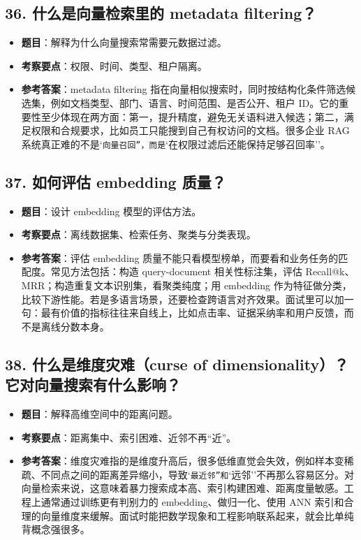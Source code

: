 \subsection{36. 什么是向量检索里的 metadata filtering？}
\begin{itemize}[leftmargin=2em]
\item \textbf{题目}：解释为什么向量搜索常需要元数据过滤。
\item \textbf{考察要点}：权限、时间、类型、租户隔离。
\item \textbf{参考答案}：metadata filtering 指在向量相似搜索时，同时按结构化条件筛选候选集，例如文档类型、部门、语言、时间范围、是否公开、租户 ID。它的重要性至少体现在两方面：第一，提升精度，避免无关语料进入候选；第二，满足权限和合规要求，比如员工只能搜到自己有权访问的文档。很多企业 RAG 系统真正难的不是`\texttt{向量召回''，而是}`在权限过滤后还能保持足够召回率''。
\end{itemize}

\subsection{37. 如何评估 embedding 质量？}
\begin{itemize}[leftmargin=2em]
\item \textbf{题目}：设计 embedding 模型的评估方法。
\item \textbf{考察要点}：离线数据集、检索任务、聚类与分类表现。
\item \textbf{参考答案}：评估 embedding 质量不能只看模型榜单，而要看和业务任务的匹配度。常见方法包括：构造 query-document 相关性标注集，评估 Recall@k、MRR；构造重复文本识别集，看聚类纯度；用 embedding 作为特征做分类，比较下游性能。若是多语言场景，还要检查跨语言对齐效果。面试里可以加一句：最有价值的指标往往来自线上，比如点击率、证据采纳率和用户反馈，而不是离线分数本身。
\end{itemize}

\subsection{38. 什么是维度灾难（curse of dimensionality）？它对向量搜索有什么影响？}
\begin{itemize}[leftmargin=2em]
\item \textbf{题目}：解释高维空间中的距离问题。
\item \textbf{考察要点}：距离集中、索引困难、近邻不再``近''。
\item \textbf{参考答案}：维度灾难指的是维度升高后，很多低维直觉会失效，例如样本变稀疏、不同点之间的距离差异缩小，导致`\texttt{最近邻''和}`远邻''不再那么容易区分。对向量检索来说，这意味着暴力搜索成本高、索引构建困难、距离度量敏感。工程上通常通过训练更有判别力的 embedding、做归一化、使用 ANN 索引和合理的向量维度来缓解。面试时能把数学现象和工程影响联系起来，就会比单纯背概念强很多。
\end{itemize}


